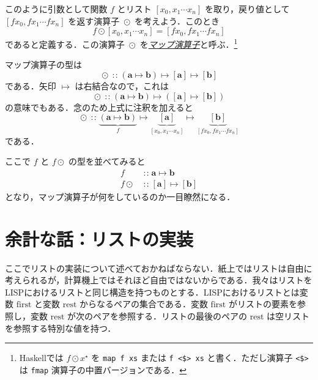 \documentclass[a4paper]{jsbook}
\newcommand{\programminglanguage}[1]{\textsf{#1}}
\newcommand{\haskell}{\programminglanguage{Haskell}}
\newcommand{\lisp}{\programminglanguage{LISP}}
\newcommand{\keyword}[1]{{\underline{\emph{#1}}}}
\newcommand{\code}[1]{\texttt{#1}}
\newcommand{\mSpecialVar}[1]{\mathrm{#1}} %
\newcommand{\mFirstVar}{\mSpecialVar{first}}
\newcommand{\mRestVar}{\mSpecialVar{rest}}
\newcommand{\mListWith}[1]{\left[#1\right]}
\newcommand{\mType}[1]{\mathbf{#1}}
\newcommand{\mListType}[1]{\mListWith{\mType{#1}}}
\newcommand{\mList}[1]{{#1}^\mathrm{\star}}
\DeclareMathOperator{\mIn}{{:\!:}}
\DeclareMathOperator{\mMapsTo}{\mapsto}
\DeclareMathOperator{\mMapList}{\odot}
\newcommand{\mProj}[2]{#1\mMapsTo#2}
\newcommand{\mathVarKeyword}[1]{\operatorname{\mathrm{#1}}}
\newcommand{\mFirstVar}{\mathVarKeyword{first}}
\begin{document}
このように引数として関数 $f$ とリスト $\mListWith{x_0,x_1\dotsb x_n}$ を取り，戻り値として $\mListWith{fx_0,fx_1\dotsb fx_n}$ を返す演算子 $\mMapList$ を考えよう．このとき
\begin{equation}
f\mMapList\mListWith{x_0,x_1\dotsb x_n}
=\mListWith{fx_0,fx_1\dotsb fx_n}
\end{equation}
であると定義する．この演算子 $\mMapList$ を\keyword{マップ演算子}と呼ぶ．\footnote{\haskell では $f\mMapList\mList{x}$ を \code{map f xs} または \code{f <\$> xs} と書く．ただし演算子 \code{<\$>} は \code{fmap} 演算子の中置バージョンである．}

マップ演算子の型は
\begin{equation}
\mMapList
\mIn{}
\mProj{
  (\mProj{\mType{a}}{\mType{b}})
}
{
  \mProj{\mListType{a}}{\mListType{b}}
}
\end{equation}
である．矢印 $\mMapsTo$ は右結合なので，これは
\begin{equation}
\mMapList
\mIn{}
\mProj{
  (\mProj{\mType{a}}{\mType{b}})
}
{
  (\mProj{\mListType{a}}{\mListType{b}})
}
\end{equation}
の意味でもある．念のため上式に注釈を加えると
\begin{equation}
\mMapList\mIn
\underbrace{\left(\mType{a}\mMapsTo\mType{b}\right)}_f
\mMapsTo
\underbrace{\mListType{a}}_{\mListWith{x_0,x_1\dotsb x_n}}
\mMapsTo
\underbrace{\mListType{b}}_{\mListWith{fx_0,fx_1\dotsb fx_n}}
\end{equation}
である．

ここで $f$ と $f\mMapList$ の型を並べてみると
\begin{align}
f&\mIn\mProj{\mType{a}}{\mType{b}}\\
f\mMapList&\mIn\mProj{\mListType{a}}{\mListType{b}}
\end{align}
となり，マップ演算子が何をしているのか一目瞭然になる．

\section{余計な話：リストの実装}

ここでリストの実装について述べておかねばならない．紙上ではリストは自由に考えられるが，計算機上ではそれほど自由ではないからである．我々はリストを\lisp におけるリストと同じ構造を持つものとする．\lisp におけるリストとは変数 $\mFirstVar$ と変数 $\mRestVar$ からなるペアの集合である．変数 $\mFirstVar$ がリストの要素を参照し，変数 $\mRestVar$ が次のペアを参照する．リストの最後のペアの $\mRestVar$ は空リストを参照する特別な値を持つ．
\end{document}
